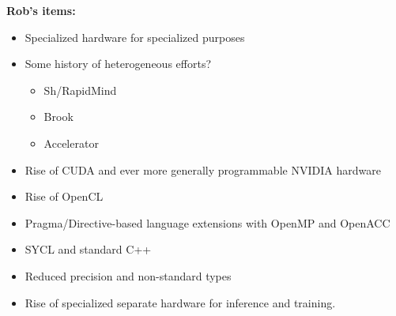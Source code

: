 \textbf{Rob's items:}
\begin{itemize}
    \item Specialized hardware for specialized purposes
    \item Some history of heterogeneous efforts?
    \begin{itemize}
        \item Sh/RapidMind
        \item Brook
        \item Accelerator
    \end{itemize}
    \item Rise of CUDA and ever more generally programmable NVIDIA hardware
    \item Rise of OpenCL
    \item Pragma/Directive-based language extensions with OpenMP and OpenACC
    \item SYCL and standard C++
    \item Reduced precision and non-standard types
    \item Rise of specialized separate hardware for inference and training.
\end{itemize}

